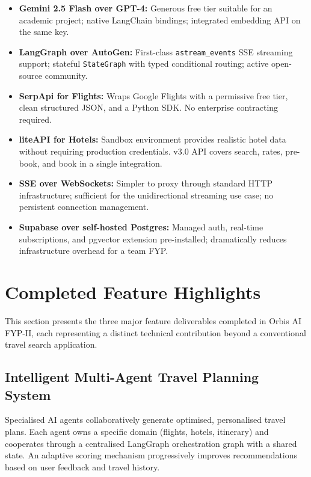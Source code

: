 \documentclass[12pt, a4paper]{article}
\begin{document}
\begin{itemize}[leftmargin=1.5cm, itemsep=0.4em]
  \item \textbf{Gemini 2.5 Flash over GPT-4:} Generous free tier suitable for an academic project; native LangChain bindings; integrated embedding API on the same key.
  \item \textbf{LangGraph over AutoGen:} First-class \texttt{astream\_events} SSE streaming support; stateful \texttt{StateGraph} with typed conditional routing; active open-source community.
  \item \textbf{SerpApi for Flights:} Wraps Google Flights with a permissive free tier, clean structured JSON, and a Python SDK. No enterprise contracting required.
  \item \textbf{liteAPI for Hotels:} Sandbox environment provides realistic hotel data without requiring production credentials. v3.0 API covers search, rates, pre-book, and book in a single integration.
  \item \textbf{SSE over WebSockets:} Simpler to proxy through standard HTTP infrastructure; sufficient for the unidirectional streaming use case; no persistent connection management.
  \item \textbf{Supabase over self-hosted Postgres:} Managed auth, real-time subscriptions, and pgvector extension pre-installed; dramatically reduces infrastructure overhead for a team FYP.
\end{itemize}

\section{Completed Feature Highlights}

This section presents the three major feature deliverables completed in Orbis AI FYP-II, each representing a distinct technical contribution beyond a conventional travel search application.

\subsection{Intelligent Multi-Agent Travel Planning System}

\begin{highlightbox}
Specialised AI agents collaboratively generate optimised, personalised travel plans. Each agent owns a specific domain (flights, hotels, itinerary) and cooperates through a centralised LangGraph orchestration graph with a shared state. An adaptive scoring mechanism progressively improves recommendations based on user feedback and travel history.
\end{highlightbox}
\end{document}
